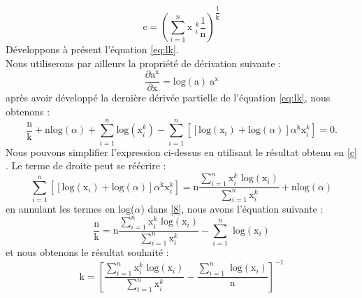 \begin{equation}
\mbox{c} = \left(\sum\limits_{i=1}^{n} \mbox{x }^{k}_{i}\dfrac{1}{\mbox{n}}\right)^{\dfrac{1}{\mbox{k}}} \label{c}
\end{equation}
Développons à présent l'équation \ref{eq:lk}. \\ 
Nous utiliserons par ailleurs la propriété de dérivation suivante :
\begin{equation}
\dfrac{\partial \mbox{a}^{\mbox{x}}}{\partial \mbox{x}} = \mbox{log}(\mbox{a})~\mbox{a}^{\mbox{x}}
\end{equation}
après avoir développé la dernière dérivée partielle de l'équation \ref{eq:lk}, nous obtenons :
\begin{equation}
 \dfrac{\mbox{n}}{\mbox{k}} + \mbox{n}\mbox{log}(\alpha) + \sum\limits_{i=1}^{n} \mbox{log}(\mbox{x}^{k}_{i}) -  \sum\limits_{i=1}^{n}  \left[ \left[ \mbox{log}(\mbox{x}_{i}) + \mbox{log}(\alpha) \right] \alpha^{\mbox{k}} \mbox{x}^{k}_{i} \right] = 0. \label{8}
\end{equation}
Nous pouvons simplifier l'expression ci-dessus en utilisant le résultat obtenu en \ref{c} . Le terme de droite peut se réécrire :
\begin{equation}
\sum\limits_{i=1}^{n}  \left[ \left[ \mbox{log}(\mbox{x}_{i}) + \mbox{log}(\alpha) \right] \alpha^{\mbox{k}} \mbox{x}^{k}_{i} \right] = \mbox{n} \dfrac{\sum\limits_{i=1}^{n} \mbox{x}^{k}_{i} \mbox{~log}(\mbox{x}_{i})}{\sum\limits_{i=1}^{n} \mbox{x}^{k}_{i}} + \mbox{n}\mbox{log}(\alpha)
\end{equation}
en annulant les termes en log($\alpha$) dans \ref{8}, nous avons l'équation suivante :
\begin{equation}
\dfrac{\mbox{n}}{\mbox{k}} = \mbox{n} \dfrac{\sum\limits_{i=1}^{n} \mbox{x}^{k}_{i} \mbox{~log}(\mbox{x}_{i})}{\sum\limits_{i=1}^{n} \mbox{x}^{k}_{i}} - \sum\limits_{i=1}^{n} \mbox{~log}(\mbox{x}_{i})
\end{equation}
et nous obtenons le résultat souhaité :
\begin{equation}
\mbox{k} = \left[\dfrac{\sum\limits_{i=1}^{n} \mbox{x}^{k}_{i} \mbox{~log}(\mbox{x}_{i})}{\sum\limits_{i=1}^{n} \mbox{x}^{k}_{i}} - \dfrac{\sum\limits_{i=1}^{n} \mbox{~log}(\mbox{x}_{i})}{\mbox{n}}\right]^{-1}
\end{equation}

